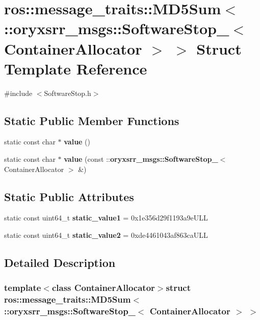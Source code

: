 \section{ros\-:\-:message\-\_\-traits\-:\-:\-M\-D5\-Sum$<$ \-:\-:oryxsrr\-\_\-msgs\-:\-:\-Software\-Stop\-\_\-$<$ \-Container\-Allocator $>$ $>$ \-Struct \-Template \-Reference}
\label{structros_1_1message__traits_1_1MD5Sum_3_01_1_1oryxsrr__msgs_1_1SoftwareStop___3_01ContainerAllocator_01_4_01_4}


{\ttfamily \#include $<$\-Software\-Stop.\-h$>$}

\subsection*{\-Static \-Public \-Member \-Functions}
\begin{DoxyCompactItemize}
\item 
static const char $\ast$ {\bf value} ()
\item 
static const char $\ast$ {\bf value} (const \-::{\bf oryxsrr\-\_\-msgs\-::\-Software\-Stop\-\_\-}$<$ \-Container\-Allocator $>$ \&)
\end{DoxyCompactItemize}
\subsection*{\-Static \-Public \-Attributes}
\begin{DoxyCompactItemize}
\item 
static const uint64\-\_\-t {\bf static\-\_\-value1} = 0x1e356d29f1193a9e\-U\-L\-L
\item 
static const uint64\-\_\-t {\bf static\-\_\-value2} = 0xde4461043af863ca\-U\-L\-L
\end{DoxyCompactItemize}


\subsection{\-Detailed \-Description}
\subsubsection*{template$<$class Container\-Allocator$>$struct ros\-::message\-\_\-traits\-::\-M\-D5\-Sum$<$ \-::oryxsrr\-\_\-msgs\-::\-Software\-Stop\-\_\-$<$ Container\-Allocator $>$ $>$}



